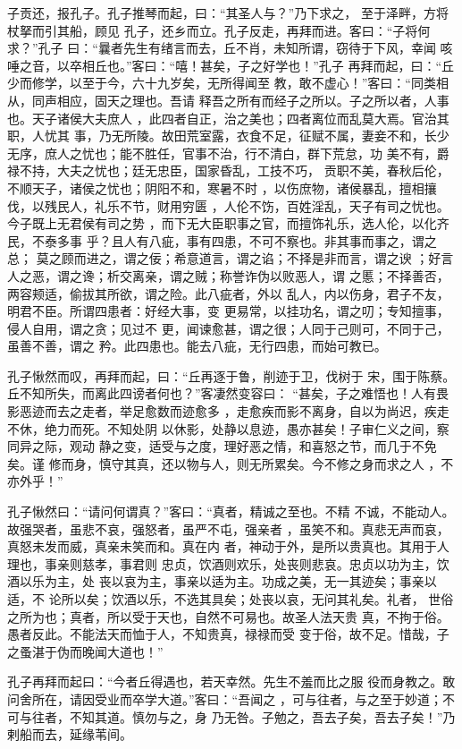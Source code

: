 \documentclass[]{article}
\begin{document}
子贡还，报孔子。孔子推琴而起，曰：``其圣人与？''乃下求之，
至于泽畔，方将杖拏而引其船，顾见
孔子，还乡而立。孔子反走，再拜而进。客曰：``子将何求？''孔子
曰：``曩者先生有绪言而去，丘不肖，未知所谓，窃待于下风，幸闻
咳唾之音，以卒相丘也。''客曰：``嘻！甚矣，子之好学也！''孔子
再拜而起，曰：``丘少而修学，以至于今，六十九岁矣，无所得闻至
教，敢不虚心！''客曰：``同类相从，同声相应，固天之理也。吾请
释吾之所有而经子之所以。子之所以者，人事也。天子诸侯大夫庶人
，此四者自正，治之美也；四者离位而乱莫大焉。官治其职，人忧其
事，乃无所陵。故田荒室露，衣食不足，征赋不属，妻妾不和，长少
无序，庶人之忧也；能不胜任，官事不治，行不清白，群下荒怠，功
美不有，爵禄不持，大夫之忧也；廷无忠臣，国家昏乱，工技不巧，
贡职不美，春秋后伦，不顺天子，诸侯之忧也；阴阳不和，寒暑不时
，以伤庶物，诸侯暴乱，擅相攘伐，以残民人，礼乐不节，财用穷匮
，人伦不饬，百姓淫乱，天子有司之忧也。今子既上无君侯有司之势
，而下无大臣职事之官，而擅饰礼乐，选人伦，以化齐民，不泰多事
乎？且人有八疵，事有四患，不可不察也。非其事而事之，谓之总；
莫之顾而进之，谓之佞；希意道言，谓之谄；不择是非而言，谓之谀
；好言人之恶，谓之谗；析交离亲，谓之贼；称誉诈伪以败恶人，谓
之慝；不择善否，两容颊适，偷拔其所欲，谓之险。此八疵者，外以
乱人，内以伤身，君子不友，明君不臣。所谓四患者：好经大事，变
更易常，以挂功名，谓之叨；专知擅事，侵人自用，谓之贪；见过不
更，闻谏愈甚，谓之很；人同于己则可，不同于己，虽善不善，谓之
矜。此四患也。能去八疵，无行四患，而始可教已。

孔子愀然而叹，再拜而起，曰：``丘再逐于鲁，削迹于卫，伐树于
宋，围于陈蔡。丘不知所失，而离此四谤者何也？''客凄然变容曰：
``甚矣，子之难悟也！人有畏影恶迹而去之走者，举足愈数而迹愈多
，走愈疾而影不离身，自以为尚迟，疾走不休，绝力而死。不知处阴
以休影，处静以息迹，愚亦甚矣！子审仁义之间，察同异之际，观动
静之变，适受与之度，理好恶之情，和喜怒之节，而几于不免矣。谨
修而身，慎守其真，还以物与人，则无所累矣。今不修之身而求之人
，不亦外乎！''

孔子愀然曰：``请问何谓真？''客曰：``真者，精诚之至也。不精
不诚，不能动人。故强哭者，虽悲不哀，强怒者，虽严不屯，强亲者
，虽笑不和。真悲无声而哀，真怒未发而威，真亲未笑而和。真在内
者，神动于外，是所以贵真也。其用于人理也，事亲则慈孝，事君则
忠贞，饮酒则欢乐，处丧则悲哀。忠贞以功为主，饮酒以乐为主，处
丧以哀为主，事亲以适为主。功成之美，无一其迹矣；事亲以适，不
论所以矣；饮酒以乐，不选其具矣；处丧以哀，无问其礼矣。礼者，
世俗之所为也；真者，所以受于天也，自然不可易也。故圣人法天贵
真，不拘于俗。愚者反此。不能法天而恤于人，不知贵真，禄禄而受
变于俗，故不足。惜哉，子之蚤湛于伪而晚闻大道也！''

孔子再拜而起曰：``今者丘得遇也，若天幸然。先生不羞而比之服
役而身教之。敢问舍所在，请因受业而卒学大道。''客曰：``吾闻之
，可与往者，与之至于妙道；不可与往者，不知其道。慎勿与之，身
乃无咎。子勉之，吾去子矣，吾去子矣！''乃剌船而去，延缘苇间。
\end{document}
